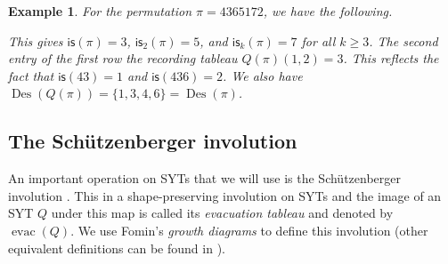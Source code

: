 \documentclass[12pt]{article}
\newcommand{\is}{\mathsf{is}}
\newcommand{\Des}{\operatorname{Des}}
\newcommand{\evac}{\operatorname{evac}}
\newtheorem{example}[theorem]{Example}
\theoremstyle{definition}
\begin{document}
\begin{example}\label{rskex}
    For the permutation $\pi = 4 3 6 5 1 7 2$, we have the following.
    \begin{center}
    \end{center}
    This gives $\is(\pi) = 3$, $\is_2(\pi) = 5$, and $\is_k(\pi) = 7$ for all $k \geq 3$. 
    The second entry of the first row the recording tableau $Q(\pi)(1, 2) = 3$. 
    This reflects the fact that $\is(43) = 1$ and $\is(436) = 2$. 
    We also have $\Des(Q(\pi)) = \{1, 3, 4, 6\} = \Des(\pi)$.
\end{example}

\subsection{The Schützenberger involution}

An important operation on SYTs that we will use is the Schützenberger involution \cite{schutzenberger}. 
This in a shape-preserving involution on SYTs and the image of an SYT $Q$ under this map is called its \emph{evacuation tableau} and denoted by $\evac(Q)$. 
We use Fomin's \emph{growth diagrams} to define this involution \cite{fomin_growth} (other equivalent definitions can be found in \cite{stanley_ec2}).
\end{document}
